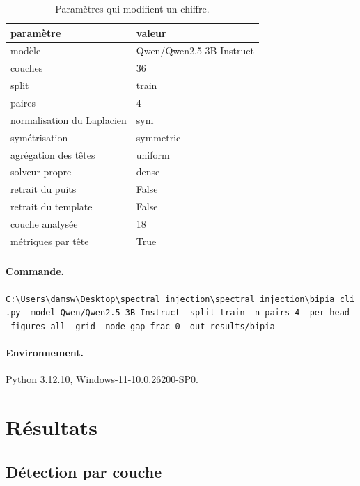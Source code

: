 \documentclass[11pt,a4paper]{article}
\begin{document}
\begin{table}[htbp]\centering\small
\begin{tabular}{ll}
\hline
paramètre & valeur \\
\hline
modèle & Qwen/Qwen2.5-3B-Instruct \\
couches & 36 \\
split & train \\
paires & 4 \\
normalisation du Laplacien & sym \\
symétrisation & symmetric \\
agrégation des têtes & uniform \\
solveur propre & dense \\
retrait du puits & False \\
retrait du template & False \\
couche analysée & 18 \\
métriques par tête & True \\
\hline
\end{tabular}
\caption{Paramètres qui modifient un chiffre.}
\label{tab:config}
\end{table}


\paragraph{Commande.}
\texttt{C:\textbackslash{}Users\textbackslash{}damsw\textbackslash{}Desktop\textbackslash{}spectral\_injection\textbackslash{}spectral\_injection\textbackslash{}bipia\_cli.py --model Qwen/Qwen2.5-3B-Instruct --split train --n-pairs 4 --per-head --figures all --grid --node-gap-frac 0 --out results/bipia}

\paragraph{Environnement.}
Python 3.12.10, Windows-11-10.0.26200-SP0.


\section{Résultats}

\subsection{Détection par couche}
\end{document}

